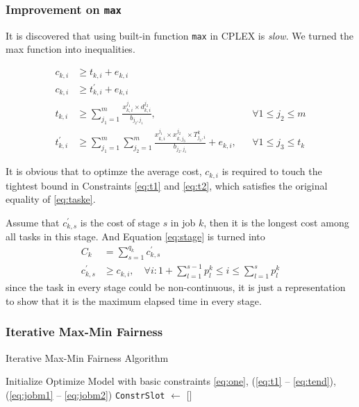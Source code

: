 \begin{frame}[allowframebreaks]
\frametitle{Improvement on \texttt{max}}
It is discovered that using built-in function \texttt{max} in CPLEX is \emph{slow}. We turned the max function into inequalities. 

\begin{align}
    c_{k,i} &\geq t_{k,i} + e_{k,i} \label{eq:t1}\\
    c_{k,i} &\geq t_{k,i}^\prime + e_{k,i} \label{eq:t2}\\
    t_{k,i} &\geq \sum_{j_1=1}^m \frac{x_{k,i}^{j_1}\times d_{k,i}^{j_2}}{b_{j_2,j_1}},&& \forall 1\leq j_2\leq m\\
    t_{k,i}^\prime &\geq \sum_{j_1=1}^m\sum_{j_2=1}^m \frac{x_{k,i}^{j_1}\times x_{k,j_3}^{j_2}\times T_{j_3,i}^k}{b_{j_2,j_1}} + e_{k,i},&& \forall 1\leq j_3\leq t_k\label{eq:tend}
\end{align}

It is obvious that to optimze the average cost, $c_{k,i}$ is required to touch the tightest bound in Constraints \eqref{eq:t1} and \eqref{eq:t2}, which satisfies the original equality of \eqref{eq:taske}.

Assume that $c^\prime_{k,s}$ is the cost of stage $s$ in job $k$, then it is the longest cost among all tasks in this stage. And Equation \eqref{eq:stage} is turned into
\begin{align}
    C_k &= \sum_{s=1}^{q_k} c^{\prime}_{k,s} \label{eq:jobm1}\\
    c^\prime_{k,s} &\geq c_{k,i},\quad \forall i: 1+\sum_{l=1}^{s-1} p_{l}^k \leq i \leq \sum_{l=1}^{s} p_{l}^k \label{eq:jobm2}
\end{align}
since the task in every stage could be non-continuous, it is just a representation to show that it is the maximum elapsed time in every stage.
\end{frame}

\begin{frame}
\frametitle{Iterative Max-Min Fairness}

\begin{algorithm}[H]
    \caption{Iterative Max-Min Fairness Algorithm}
    Initialize Optimize Model with basic constraints \eqref{eq:one}, (\ref{eq:t1} -- \ref{eq:tend}), (\ref{eq:jobm1} -- \ref{eq:jobm2})\;
    \texttt{ConstrSlot} $\leftarrow$ []\;
\end{algorithm}
\end{frame}

